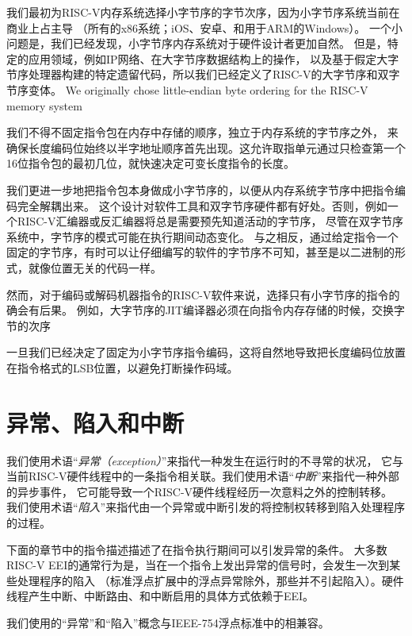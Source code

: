 \begin{commentary}
我们最初为RISC-V内存系统选择小字节序的字节次序，因为小字节序系统当前在商业上占主导
（所有的x86系统；iOS、安卓、和用于ARM的Windows）。
一个小问题是，我们已经发现，小字节序内存系统对于硬件设计者更加自然。
但是，特定的应用领域，例如IP网络、在大字节序数据结构上的操作，
以及基于假定大字节序处理器构建的特定遗留代码，所以我们已经定义了RISC-V的大字节序和双字节序变体。
We originally chose little-endian byte ordering for the RISC-V memory system

我们不得不固定指令包在内存中存储的顺序，独立于内存系统的字节序之外，
来确保长度编码位始终以半字地址顺序首先出现。这允许取指单元通过只检查第一个16位指令包的最初几位，就快速决定可变长度指令的长度。

我们更进一步地把指令包本身做成小字节序的，以便从内存系统字节序中把指令编码完全解耦出来。
这个设计对软件工具和双字节序硬件都有好处。否则，例如一个RISC-V汇编器或反汇编器将总是需要预先知道活动的字节序，
尽管在双字节序系统中，字节序的模式可能在执行期间动态变化。
与之相反，通过给定指令一个固定的字节序，有时可以让仔细编写的软件的字节序不可知，甚至是以二进制的形式，就像位置无关的代码一样。

然而，对于编码或解码机器指令的RISC-V软件来说，选择只有小字节序的指令的确会有后果。
例如，大字节序的JIT编译器必须在向指令内存存储的时候，交换字节的次序

一旦我们已经决定了固定为小字节序指令编码，这将自然地导致把长度编码位放置在指令格式的LSB位置，以避免打断操作码域。
\end{commentary}

\section{异常、陷入和中断}
\label{sec:trap-defn}

我们使用术语“{\em 异常（exception）}”来指代一种发生在运行时的不寻常的状况，
它与当前RISC-V硬件线程中的一条指令相关联。我们使用术语“{\em 中断}”来指代一种外部的异步事件，
它可能导致一个RISC-V硬件线程经历一次意料之外的控制转移。
我们使用术语“{\em 陷入}”来指代由一个异常或中断引发的将控制权转移到陷入处理程序的过程。

下面的章节中的指令描述描述了在指令执行期间可以引发异常的条件。
大多数RISC-V EEI的通常行为是，当在一个指令上发出异常的信号时，会发生一次到某些处理程序的陷入
（标准浮点扩展中的浮点异常除外，那些并不引起陷入）。硬件线程产生中断、中断路由、和中断启用的具体方式依赖于EEI。


\begin{commentary}
  我们使用的“异常”和“陷入”概念与IEEE-754浮点标准中的相兼容。
\end{commentary}

